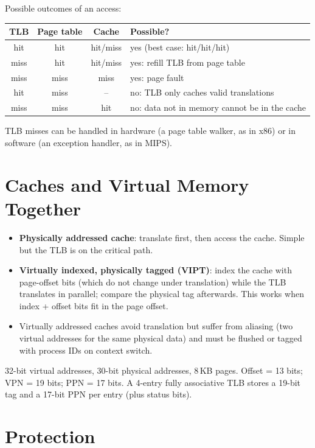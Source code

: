 Possible outcomes of an access:
\begin{center}
\begin{tabular}{cccl}
\toprule
TLB & Page table & Cache & Possible? \\
\midrule
hit & hit & hit/miss & yes (best case: hit/hit/hit) \\
miss & hit & hit/miss & yes: refill TLB from page table \\
miss & miss & miss & yes: page fault \\
hit & miss & -- & no: TLB only caches valid translations \\
miss & miss & hit & no: data not in memory cannot be in the cache \\
\bottomrule
\end{tabular}
\end{center}

TLB misses can be handled in hardware (a page table walker, as in x86) or in
software (an exception handler, as in MIPS).

\section{Caches and Virtual Memory Together}

\begin{itemize}
  \item \textbf{Physically addressed cache}: translate first, then access the
    cache. Simple but the TLB is on the critical path.
  \item \textbf{Virtually indexed, physically tagged (VIPT)}: index the cache
    with page-offset bits (which do not change under translation) while the
    TLB translates in parallel; compare the physical tag afterwards. This
    works when index + offset bits fit in the page offset.
  \item Virtually addressed caches avoid translation but suffer from aliasing
    (two virtual addresses for the same physical data) and must be flushed
    or tagged with process IDs on context switch.
\end{itemize}

\begin{example}
32-bit virtual addresses, 30-bit physical addresses, 8\,KB pages. Offset =
13 bits; VPN = 19 bits; PPN = 17 bits. A 4-entry fully associative TLB stores
a 19-bit tag and a 17-bit PPN per entry (plus status bits).
\end{example}

\section{Protection}

